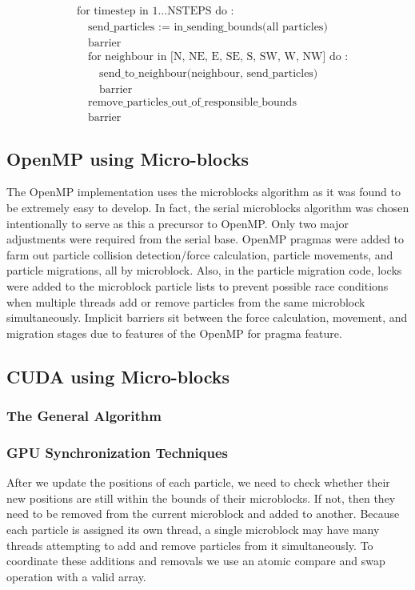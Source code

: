 \documentclass[11pt]{article} %
\begin{document}
\[
\begin{aligned} & \text{for timestep in }1\ldots\text{NSTEPS do :}\\
 & \quad\text{send\_particles := in\_sending\_bounds(all particles)}\\
 & \quad\text{barrier}\\
 & \quad\text{for neighbour in [N, NE, E, SE, S, SW, W, NW] do :}\\
 & \quad\quad\text{send\_to\_neighbour(neighbour, send\_particles)}\\
 & \quad\quad\text{barrier}\\
 & \quad\text{remove\_particles\_out\_of\_responsible\_bounds}\\
 & \quad\text{barrier}
\end{aligned}
\]

\subsection{OpenMP using Micro-blocks}

The OpenMP implementation uses the microblocks algorithm as it was found to be extremely easy to develop. In fact, the serial microblocks algorithm was chosen intentionally to serve as this a precursor to OpenMP. Only two major adjustments were required from the serial base. OpenMP pragmas were added to farm out particle collision detection/force calculation, particle movements, and particle migrations, all by microblock. Also, in the particle migration code, locks were added to the microblock particle lists to prevent possible race conditions when multiple threads add or remove particles from the same microblock simultaneously. Implicit barriers sit between the force calculation, movement, and migration stages due to features of the OpenMP for pragma feature.

\subsection{CUDA using Micro-blocks}

\subsubsection{The General Algorithm}

\subsubsection{GPU Synchronization Techniques}
After we update the positions of each particle, we need to check whether
their new positions are still within the bounds of their microblocks.
If not, then they need to be removed from the current microblock and
added to another. Because each particle is assigned its own thread,
a single microblock may have many threads attempting to add and remove
particles from it simultaneously. To coordinate these additions and
removals we use an atomic compare and swap operation with a valid
array.
\end{document}
